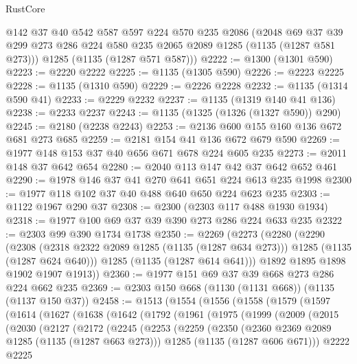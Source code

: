 \begin{lexlean}{RustCore}
\begin{coremodule}
      @142
      @37
      @40
      @542
      @587
      @597
      @224
      @570
      @235
      @2086
      (@2048 @69 @37 @39 @299 @273 @286 @224 @580 @235 @2065 @2089 @1285 (@1135 (@1287 @581 @273)))
      @1285
      (@1135 (@1287 @571 @587)))
@2222 := @1300 (@1301 @590)
@2223 := @2220 @2222
@2225 := @1135 (@1305 @590)
@2226 := @2223 @2225
@2228 := @1135 (@1310 @590)
@2229 := @2226 @2228
@2232 := @1135 (@1314 @590 @41)
@2233 := @2229 @2232
@2237 := @1135 (@1319 @140 @41 @136)
@2238 := @2233 @2237
@2243 := @1135 (@1325 (@1326 (@1327 @590)) @290)
@2245 := @2180 (@2238 @2243)
@2253 := @2136 @600 @155 @160 @136 @672 @681 @273 @685
@2259 := @2181 @154 @41 @136 @672 @679 @590
@2269 := @1977 @148 @153 @37 @40 @656 @671 @678 @224 @605 @235
@2273 := @2011 @148 @37 @642 @654
@2280 := @2040 @113 @147 @42 @37 @642 @652 @461
@2290 := @1978 @146 @37 @41 @270 @641 @651 @224 @613 @235 @1998
@2300 := @1977 @118 @102 @37 @40 @488 @640 @650 @224 @623 @235
@2303 := @1122 @1967 @290 @37
@2308 := @2300 (@2303 @117 @488 @1930 @1934)
@2318 := @1977 @100 @69 @37 @39 @390 @273 @286 @224 @633 @235
@2322 := @2303 @99 @390 @1734 @1738
@2350 := @2269
    (@2273
      (@2280
        (@2290
          (@2308
            (@2318 @2322 @2089 @1285 (@1135 (@1287 @634 @273)))
            @1285
            (@1135 (@1287 @624 @640)))
          @1285
          (@1135 (@1287 @614 @641)))
        @1892
        @1895
        @1898
        @1902
        @1907
        @1913))
@2360 := @1977 @151 @69 @37 @39 @668 @273 @286 @224 @662 @235
@2369 := @2303 @150 @668 (@1130 (@1131 @668)) (@1135 (@1137 @150 @37))
@2458 := @1513
    (@1554
      (@1556
        (@1558
          (@1579
            (@1597
              (@1614
                (@1627
                  (@1638
                    (@1642
                      (@1792
                        (@1961
                          (@1975
                            (@1999
                              (@2009
                                (@2015
                                  (@2030
                                    (@2127
                                      (@2172
                                        (@2245
                                          (@2253
                                            (@2259
                                              (@2350
                                                (@2360 @2369 @2089 @1285 (@1135 (@1287 @663 @273)))
                                                @1285
                                                (@1135 (@1287 @606 @671)))
                                              @2222
                                              @2225

\end{coremodule}
\end{lexlean}
